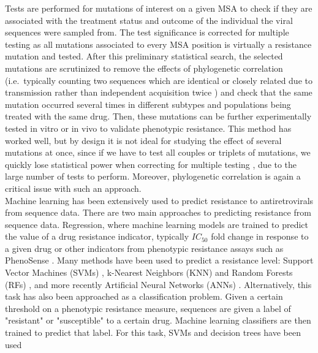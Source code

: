 \documentclass[
  11,
]{scrbook}
\begin{document}
Tests are performed for mutations of interest on a given MSA to check if
they are associated with the treatment status and outcome of the
individual the viral sequences were sampled from. The test significance
is corrected for multiple testing as all mutations associated to every
MSA position is virtually a resistance mutation and tested. After this
preliminary statistical search, the selected mutations are scrutinized
to remove the effects of phylogenetic correlation (i.e.~typically
counting two sequences which are identical or closely related due to
transmission rather than independent acquisition twice
\autocite{maddisonUnsolvedChallengePhylogenetic2015}) and check that the same
mutation occurred several times in different subtypes and populations
being treated with the same drug. Then, these mutations can be further
experimentally tested in vitro or in vivo to validate phenotypic
resistance. This method has worked well, but by design it is not ideal
for studying the effect of several mutations at once, since if we have
to test all couples or triplets of mutations, we quickly lose
statistical power when correcting for multiple testing
\autocite{shamStatisticalPowerSignificance2014}, due to the large number of
tests to perform. Moreover, phylogenetic correlation is again a critical
issue with such an approach.\\
Machine learning has been extensively used to predict resistance to
antiretrovirals from sequence data. There are two main approaches to
predicting resistance from sequence data. Regression, where machine
learning models are trained to predict the value of a drug resistance
indicator, typically \(IC_{50}\) fold change in response to a given drug
\autocite{lengauerBioinformaticsassistedAntiHIVTherapy2006} or other indicators
from phenotypic resistance assays such as PhenoSense
\autocite{zhangComparisonPrecisionSensitivity2005a}. Many methods have been used
to predict a resistance level: Support Vector Machines (SVMs)
\autocite{beerenwinkelGeno2phenoEstimatingPhenotypic2003b}, k-Nearest Neighbors
(KNN) and Random Forests (RFs) \autocite{shenAutomatedPredictionHIV2016a}, and
more recently Artificial Neural Networks (ANNs)
\autocite{yuPredictionHIVDrug2014a,sheikamamuddyImprovingFoldResistance2017b}.
Alternatively, this task has also been approached as a classification
problem. Given a certain threshold on a phenotypic resistance measure,
sequences are given a label of "resistant" or "susceptible" to a
certain drug. Machine learning classifiers are then trained to predict
that label. For this task, SVMs and decision trees have been used
\end{document}
